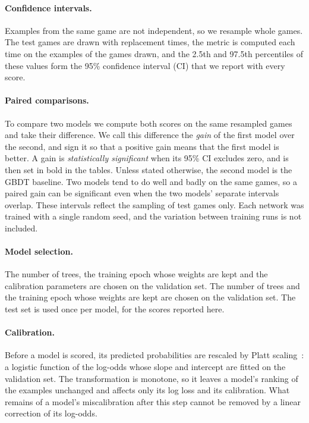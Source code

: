 \paragraph{Confidence intervals.}
Examples from the same game are not independent, so we resample whole games.
The test games are drawn with replacement  times, the
metric is computed each time on the examples of the games drawn, and the
2.5th and 97.5th percentiles of these values form the 95\% confidence
interval (CI) that we report with every score.

\paragraph{Paired comparisons.}
To compare two models we compute both scores on the same resampled games and
take their difference. We call this difference the \emph{gain} of the first
model over the second, and sign it so that a positive gain means that the
first model is better. A gain is \emph{statistically significant} when its
95\% CI excludes zero, and is then set in bold in the tables. Unless stated
otherwise, the second model is the GBDT baseline. Two models tend to do well
and badly on the same games, so a paired gain can be significant even when
the two models' separate intervals overlap. These intervals reflect the
sampling of test games only. Each network was trained with a single random
seed, and the variation between training runs is not included.

\paragraph{Model selection.}
\ifchance
The number of trees, the training epoch whose weights are kept and the
calibration parameters are chosen on the validation set.
\else
The number of trees and the training epoch whose weights are kept are chosen
on the validation set.
\fi
The test set is used once per model, for the scores reported here.

\ifchance
\paragraph{Calibration.}
Before a model is scored, its predicted probabilities are rescaled by Platt
scaling~\cite{platt}: a logistic function of the log-odds whose slope and
intercept are fitted on the validation set. The transformation is monotone,
so it leaves a model's ranking of the examples unchanged and affects only its
log loss and its calibration. What remains of a model's miscalibration after
this step cannot be removed by a linear correction of its log-odds.
\fi

